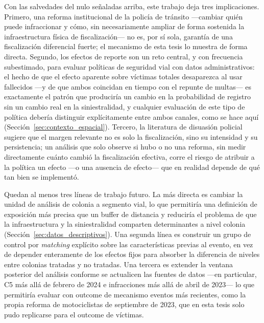 Con las salvedades del nulo señaladas arriba, este trabajo deja tres
implicaciones. Primero, una reforma institucional de la policía de tránsito
—cambiar quién puede infraccionar y cómo, sin necesariamente ampliar de forma
sostenida la infraestructura física de fiscalización— no es, por sí sola,
garantía de una fiscalización diferencial fuerte; el mecanismo de esta tesis
lo muestra de forma directa. Segundo, los efectos de reporte son un reto
central, y con frecuencia subestimado, para evaluar políticas de seguridad
vial con datos administrativos: el hecho de que el efecto aparente sobre
víctimas totales desaparezca al usar fallecidos —y de que ambos coincidan en
tiempo con el repunte de multas— es exactamente el patrón que produciría un
cambio en la probabilidad de registro sin un cambio real en la
siniestralidad, y cualquier evaluación de este tipo de política debería
distinguir explícitamente entre ambos canales, como se hace aquí
(Sección~\ref{sec:contexto_espacial}). Tercero, la literatura de disuasión
policial \citep{chalfinmccrary2017,deangelohansen2014} sugiere que
el margen relevante no es solo la fiscalización, sino su intensidad y su
persistencia; un análisis que solo observe si hubo o no una reforma, sin
medir directamente cuánto cambió la fiscalización efectiva, corre el riesgo de
atribuir a la política un efecto —o una ausencia de efecto— que en realidad
depende de qué tan bien se implementó.

Quedan al menos tres líneas de trabajo futuro. La más directa es cambiar la
unidad de análisis de colonia a segmento vial, lo que permitiría una
definición de exposición más precisa que un buffer de distancia y reduciría
el problema de que la infraestructura y la siniestralidad comparten
determinantes a nivel colonia (Sección~\ref{sec:datos_descriptivos}). Una
segunda línea es construir un grupo de control por \emph{matching} explícito
sobre las características previas al evento, en vez de depender enteramente
de los efectos fijos para absorber la diferencia de niveles entre colonias
tratadas y no tratadas. Una tercera es extender la ventana posterior del
análisis conforme se actualicen las fuentes de datos —en particular, C5 más
allá de febrero de 2024 e infracciones más allá de abril de 2023— lo que
permitiría evaluar con outcome de mecanismo eventos más recientes, como la
propia reforma de motociclistas de septiembre de 2023, que en esta tesis solo
pudo replicarse para el outcome de víctimas.
